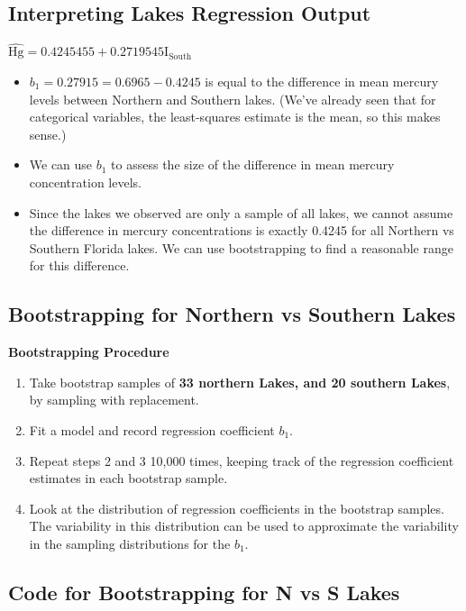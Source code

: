 \documentclass[]{book}
\begin{document}
\subsection{Interpreting Lakes Regression
Output}\label{interpreting-lakes-regression-output}

\(\widehat{\text{Hg}} = 0.4245455 +0.2719545\text{I}_{\text{South}}\)

\begin{itemize}
\item
  \(b_1 = 0.27915= 0.6965 - 0.4245\) is equal to the difference in mean
  mercury levels between Northern and Southern lakes. (We've already
  seen that for categorical variables, the least-squares estimate is the
  mean, so this makes sense.)
\item
  We can use \(b_1\) to assess the size of the difference in mean
  mercury concentration levels.
\item
  Since the lakes we observed are only a sample of all lakes, we cannot
  assume the difference in mercury concentrations is exactly 0.4245 for
  all Northern vs Southern Florida lakes. We can use bootstrapping to
  find a reasonable range for this difference.
\end{itemize}

\subsection{Bootstrapping for Northern vs Southern
Lakes}\label{bootstrapping-for-northern-vs-southern-lakes}

\textbf{Bootstrapping Procedure}

\begin{enumerate}
\def\labelenumi{\arabic{enumi}.}
\item
  Take bootstrap samples of \textbf{33 northern Lakes, and 20 southern
  Lakes}, by sampling with replacement.
\item
  Fit a model and record regression coefficient \(b_1\).
\item
  Repeat steps 2 and 3 10,000 times, keeping track of the regression
  coefficient estimates in each bootstrap sample.
\item
  Look at the distribution of regression coefficients in the bootstrap
  samples. The variability in this distribution can be used to
  approximate the variability in the sampling distributions for the
  \(b_1\).
\end{enumerate}

\subsection{Code for Bootstrapping for N vs S
Lakes}\label{code-for-bootstrapping-for-n-vs-s-lakes}
\end{document}
